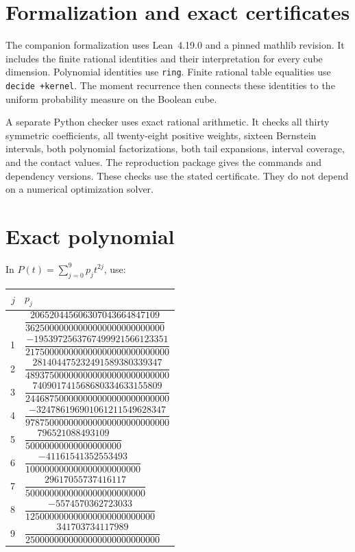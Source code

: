 \documentclass[11pt]{article}
\begin{document}
\section{Formalization and exact certificates}

The companion formalization uses Lean~4.19.0 and a pinned mathlib revision. It includes the finite rational identities and their interpretation for every cube dimension. Polynomial identities use \texttt{ring}. Finite rational table equalities use \texttt{decide +kernel}. The moment recurrence then connects these identities to the uniform probability measure on the Boolean cube.

A separate Python checker uses exact rational arithmetic. It checks all thirty symmetric coefficients, all twenty-eight positive weights, sixteen Bernstein intervals, both polynomial factorizations, both tail expansions, interval coverage, and the contact values. The reproduction package gives the commands and dependency versions. These checks use the stated certificate. They do not depend on a numerical optimization solver.

\appendix

\hypertarget{appendix-a.-exact-polynomial}{%
\section{Exact polynomial}\label{appendix-a.-exact-polynomial}}

In \(P(t)=\sum_{j=0}^9p_jt^{2j}\), use:

\begingroup
\small
\renewcommand{\arraystretch}{1.7}
\begin{longtable}{@{}r@{\qquad}l@{}}
\toprule
$j$ & $p_j$ \\
\midrule
\endhead
\bottomrule
\endlastfoot
0 & \(\dfrac{206520445606307043664847109}{36250000000000000000000000000}\) \\[6pt]
1 & \(\dfrac{-1953972563767499921566123351}{217500000000000000000000000000}\) \\[6pt]
2 & \(\dfrac{281404475232491589380339347}{489375000000000000000000000000}\) \\[6pt]
3 & \(\dfrac{740901741568680334633155809}{244687500000000000000000000000}\) \\[6pt]
4 & \(\dfrac{-324786196901061211549628347}{978750000000000000000000000000}\) \\[6pt]
5 & \(\dfrac{796521088493109}{50000000000000000000}\) \\[6pt]
6 & \(\dfrac{-41161541352553493}{100000000000000000000000}\) \\[6pt]
7 & \(\dfrac{29617055737416117}{5000000000000000000000000}\) \\[6pt]
8 & \(\dfrac{-5574570362723033}{125000000000000000000000000}\) \\[6pt]
9 & \(\dfrac{341703734117989}{2500000000000000000000000000}\) \\[6pt]
\end{longtable}
\endgroup
\end{document}
